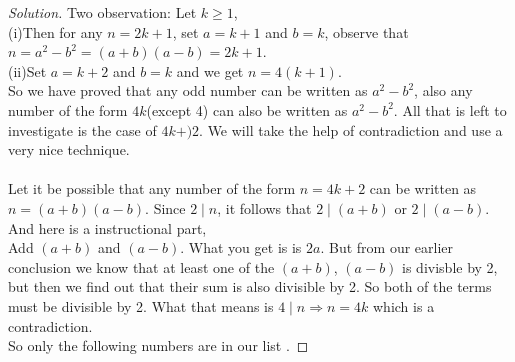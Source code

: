 \documentclass{scrartcl} %
\begin{document}
\begin{proof}[Solution]
Two observation: Let $k \geq 1$,\\ (i)Then for any $n = 2k+1$, set $a = k + 1$ and $b = k$, observe that\\ $n = a^2 - b^2 = \left(a + b\right)\left(a - b\right) = 2k + 1$.\\
(ii)Set $a = k + 2$ and $b = k$ and we get $n = 4\left(k + 1\right)$.\\
So we have proved that any odd number can be written as $a^2 - b^2$, also any number of the form $4k$(except 4) can also be written as $a^2 - b^2$. All that is left to investigate is the case of $4k + )2$. We will take the help of contradiction and use a very nice technique.\\
\\
Let it be possible that any number of the form $n = 4k + 2$ can be written as $n = (a + b)(a - b)$. Since $2 \mid n$, it follows that $2 \mid (a + b)$ or $2 \mid (a - b)$.\\
And here is a instructional part,\\
Add $\left(a+b\right)$ and $\left(a - b\right)$. What you get is is $2a$. But from our earlier conclusion we know that at least one of the $\left(a + b\right)$, $\left(a - b\right)$ is divisble by 2, but then we find out that their sum is also divisible by 2. So both of the terms must be divisible by 2. What that means is $4 \mid n \Rightarrow n = 4k$ which is a contradiction.\\
So only the following numbers are in our list .
\end{proof}
\end{document}
